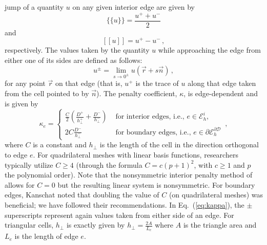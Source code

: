 \documentclass[preprint,10pt]{elsarticle}
\newcommand{\jmp}[1]{[\![#1]\!]}                     %
\newcommand{\mvl}[1]{\{\!\!\{#1\}\!\!\}}             %
\newcommand{\D}{\mathcal{D}}
\newcommand{\vr}{\vec{r}}
\newcommand{\vn}{\vec{n}}
\newcommand{\EI}{\mathcal{E}_h^i}
\newcommand{\eqt}[1]{Eq.~(\ref{#1})}                     %
\newcommand{\tf}{b}
\begin{document}
jump of a quantity $u$ on any given interior edge are given by
\begin{equation} \label{eq:mean}
\mvl{u} = \frac{u^+ + u^-}{2}
\end{equation}
and
\begin{equation} \label{eq:jump}
\jmp{u} = u^+ - u^- \, ,
\end{equation}
respectively.  The values taken by the quantity $u$ while approaching the edge from either one of its sides are defined as follows:
\begin{equation} \label{eq:upm}
u^\pm = \lim_{s\to 0^\pm} u(\vr + s \vn) \, ,
\end{equation}
for any point $\vr$ on that edge (that is, $u^+$ is the trace of $u$ along that edge taken from the cell pointed to by $\vn$).
%
The penalty coefficient, $\kappa$, is edge-dependent and is given by
\begin{equation} \label{eq:kappa}
  \kappa_e = \left\{
    \begin{array}{ll}
      \frac{C}{2} \left( \frac{D^+}{h_\bot^+} + \frac{D^-}{h_\bot^-} \right) & \textrm{ for interior edges, i.e., } e \in \EI,\\
      2C \frac{D^-}{h_\bot^-}  & \textrm{ for boundary edges, i.e., } e \in \partial \mathcal{E}_h^{\partial\D}
    \end{array}
    \right. \, ,
\end{equation}
where $C$ is a constant and $h_{\bot}$ is the length of the cell in the direction 
orthogonal to edge $e$. 
For quadrilateral meshes with linear basis functions, researchers typically utilize $C \ge 4$ 
(through the formula $C=c(p+1)^2$, with $c\ge 1$ and $p$ the polynomial order).  %
Note that the nonsymmetric interior penalty method of \cite{Babuska1999103}
allows for $C=0$ but the resulting linear system is nonsymmetric. %
For boundary edges, 
Kanschat \cite{Kanschat2007} noted that doubling the value of $C$ (on quadrilateral meshes) was 
beneficial; we have followed their recommendations. In \eqt{eq:kappa}, the $\pm$ superscripts 
represent again values taken from either side of an edge. For triangular cells, $h_\bot$ is exactly 
given by $h_{\bot}=\frac{2A}{L_e}$ where $A$ is the triangle area and $L_e$ is the length of edge $e$. 
\end{document}
